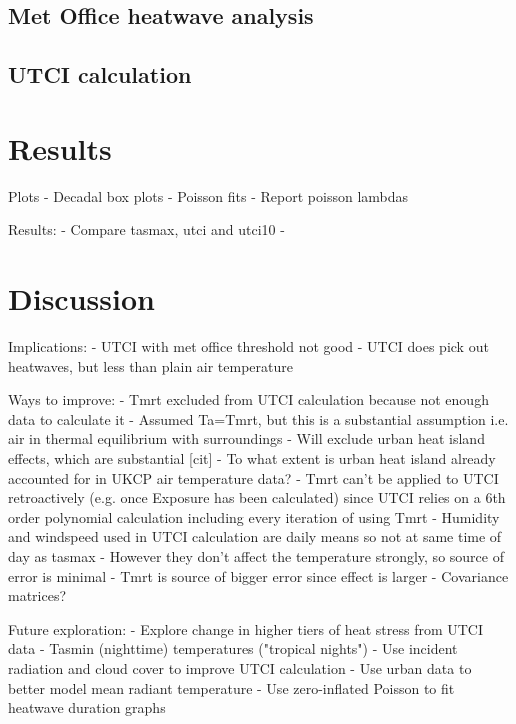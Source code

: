 \documentclass[10pt,letterpaper]{article}
\begin{document}
\subsection*{Met Office heatwave analysis}


\subsection*{UTCI calculation}










\section*{Results}



Plots
- Decadal box plots
- Poisson fits
- Report poisson lambdas

Results:
- Compare tasmax, utci and utci10
- 

\section*{Discussion}

Implications:
- UTCI with met office threshold not good
- UTCI does pick out heatwaves, but less than plain air temperature

Ways to improve:
- Tmrt excluded from UTCI calculation because not enough data to calculate it
    - Assumed Ta=Tmrt, but this is a substantial assumption i.e. air in thermal equilibrium with surroundings
    - Will exclude urban heat island effects, which are substantial [cit]
    - To what extent is urban heat island already accounted for in UKCP air temperature data?
    - Tmrt can't be applied to UTCI retroactively (e.g. once Exposure has been calculated) since UTCI relies on a 6th order polynomial calculation including every iteration of using Tmrt
- Humidity and windspeed used in UTCI calculation are daily means so not at same time of day as tasmax
    - However they don't affect the temperature strongly, so source of error is minimal
    - Tmrt is source of bigger error since effect is larger
    - Covariance matrices?


Future exploration:
- Explore change in higher tiers of heat stress from UTCI data
- Tasmin (nighttime) temperatures ("tropical nights")
- Use incident radiation and cloud cover to improve UTCI calculation
- Use urban data to better model mean radiant temperature
- Use zero-inflated Poisson to fit heatwave duration graphs
\end{document}
